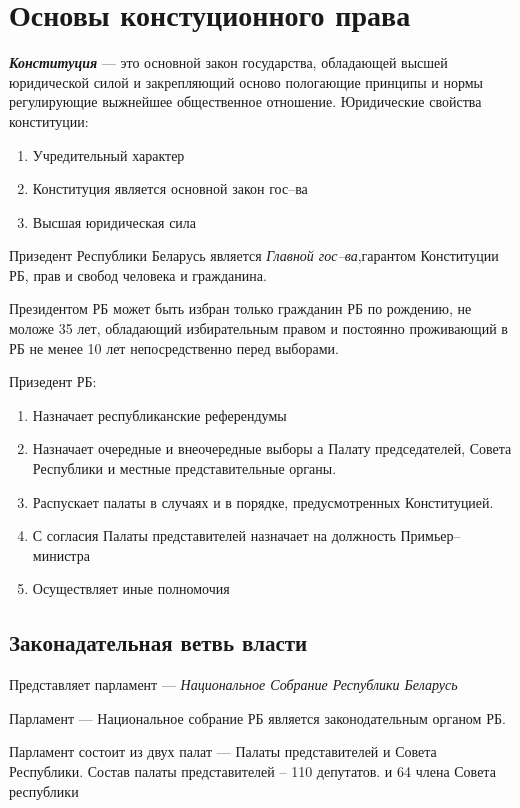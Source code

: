 \documentclass[14pt]{extarticle}
\begin{document}
	\newpage
	\section{Основы констуционного права}
	\textbf{\textit{Конституция}} --- это основной закон государства, обладающей высшей юридической силой и закрепляющий осново пологающие принципы и нормы регулирующие выжнейшее общественное отношение.
	Юридические свойства конституции: 
	\begin{enumerate}
		\item Учредительный характер
		\item Конституция является основной закон гос--ва
		\item Высшая юридическая сила
	\end{enumerate}
	
	Призедент Республики Беларусь является \textit{Главной гос--ва},гарантом Конституции РБ, прав и свобод человека и гражданина.
	
	Президентом РБ может быть избран только гражданин РБ по рождению, не моложе 35 лет, обладающий избирательным правом и постоянно проживающий в РБ не менее 10 лет непосредственно перед выборами.
	
	Призедент РБ:
	\begin{enumerate}
		\item Назначает республиканские референдумы
		\item Назначает очередные и внеочередные выборы а Палату председателей, Совета Республики и местные представительные органы.
		\item Распускает палаты в случаях и в порядке, предусмотренных Конституцией.
		\item С согласия Палаты представителей назначает на должность Примьер--министра
		\item Осуществляет иные полномочия
	\end{enumerate}
	\subsection{Законадательная ветвь власти}
	
	Представляет парламент --- \textit{Национальное Собрание Республики Беларусь}
	
	Парламент --- Национальное собрание РБ является законодательным органом РБ.
	
	Парламент состоит из двух палат --- Палаты представителей и Совета Республики. Состав палаты представителей -- 110 депутатов. и 64 члена Совета республики
	
\end{document}
